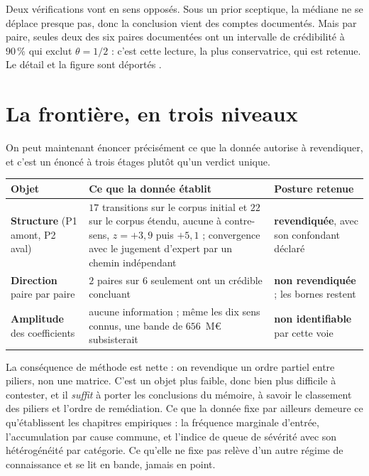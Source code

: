 Deux vérifications vont en sens opposés. Sous un prior sceptique, la médiane ne se déplace
presque pas, donc la conclusion vient des comptes documentés. Mais par paire, seules deux des six
paires documentées ont un intervalle de crédibilité à $90\,\%$ qui exclut $\theta=1/2$ : c'est
cette lecture, la plus conservatrice, qui est retenue. Le détail et la figure sont déportés
\matcomp.

\section{La frontière, en trois niveaux}

On peut maintenant énoncer précisément ce que la donnée autorise à revendiquer, et c'est un
énoncé à trois étages plutôt qu'un verdict unique.

\begin{center}\small
\renewcommand{\arraystretch}{1.3}
\begin{tabular}{@{}p{3.2cm} p{7.4cm} p{4.2cm}@{}}
\toprule
\textbf{Objet} & \textbf{Ce que la donnée établit} & \textbf{Posture retenue} \\
\midrule
\textbf{Structure} \newline (P1 amont, P2 aval) &
$17$ transitions sur le corpus initial et $22$ sur le corpus étendu, aucune à contre-sens,
$z=+3{,}9$ puis $+5{,}1$ ; convergence avec le jugement d'expert par un chemin indépendant &
\textbf{revendiquée}, avec son confondant déclaré \\
\textbf{Direction} \newline paire par paire &
$2$ paires sur $6$ seulement ont un crédible concluant &
\textbf{non revendiquée} ; les bornes restent \\
\textbf{Amplitude} \newline des coefficients &
aucune information ; même les dix sens connus, une bande de $656$~M\euro{} subsisterait &
\textbf{non identifiable} par cette voie \\
\bottomrule
\end{tabular}
\end{center}

\vspace{4pt}
La conséquence de méthode est nette : on revendique un ordre partiel entre piliers, non
une matrice. C'est un objet plus faible, donc bien plus difficile à contester, et il \emph{suffit}
à porter les conclusions du mémoire, à savoir le classement des piliers et l'ordre de
remédiation. Ce que la donnée fixe par ailleurs demeure ce qu'établissent les chapitres
empiriques : la fréquence marginale d'entrée, l'accumulation par cause commune, et l'indice de
queue de sévérité avec son hétérogénéité par catégorie. Ce qu'elle ne fixe pas relève d'un autre
régime de connaissance et se lit en bande, jamais en point.

